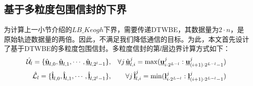 \subsection{基于多粒度包围信封的下界} 
为计算上一小节介绍的$LB\_Keogh$下界，需要传递DTWBE，其数据量为$2\cdot n$，是原始轨迹数据量的两倍。因此，不满足我们降低通信的目标。为此，本文首先设计了基于DTWBE的多粒度包围信封。多粒度信封的第$l$层边界计算方式如下：
\begin{eqnarray}\label{eq:hatUL}
\hat{{\cal U}}_l =\{ \hat{\emph{{\textbf{u}}}}_{l,0}, \hat{\emph{{\textbf{u}}}}_{l,1},\cdots, \hat{\emph{{\textbf{u}}}}_{l,2^l-1}\}  &,&
\forall j  \, \hat{\emph{{\textbf{u}}}}_{l,i}^{j}=\max(\emph{{\textbf{u}}}_{i\cdot 2^{L-l}}^{j} : \emph{{\textbf{u}}}_{(i+1)\cdot 2^{L-l}-1}^{j})  \nonumber \\
\hat{{\cal L}}_l=\{\hat{\emph{{\textbf{l}}}}_{l,0}, \hat{\emph{{\textbf{l}}}}_{l,1},\cdots, \hat{\emph{{\textbf{l}}}}_{l,2^l-1}\}   &,&
\forall j  \, \hat{\emph{{\textbf{l}}}}_{l,i}^{j}=\min(\emph{{\textbf{l}}}_{i\cdot 2^{L-l}}^{j} : \emph{{\textbf{l}}}_{(i+1)\cdot 2^{L-l}-1}^{j})
\end{eqnarray}	

